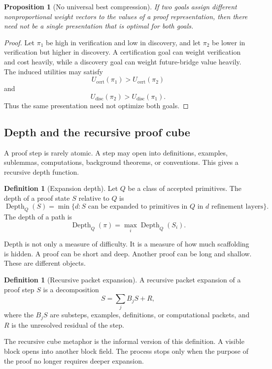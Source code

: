 \documentclass[11pt]{article}
\newtheorem{proposition}[theorem]{Proposition}
\theoremstyle{definition}
\newtheorem{definition}[theorem]{Definition}
\theoremstyle{remark}
\DeclareMathOperator{\Depth}{Depth}
\begin{document}
\begin{proposition}[No universal best compression]
If two goals assign different nonproportional weight vectors to the values of a proof representation, then there need not be a single presentation that is optimal for both goals.
\end{proposition}

\begin{proof}
Let $\pi_1$ be high in verification and low in discovery, and let $\pi_2$ be lower in verification but higher in discovery.  A certification goal can weight verification and cost heavily, while a discovery goal can weight future-bridge value heavily.  The induced utilities may satisfy
\[
        U_{\mathrm{cert}}(\pi_1)>U_{\mathrm{cert}}(\pi_2)
\]
and
\[
        U_{\mathrm{disc}}(\pi_2)>U_{\mathrm{disc}}(\pi_1).
\]
Thus the same presentation need not optimize both goals.
\end{proof}

\subsection{Depth and the recursive proof cube}

A proof step is rarely atomic.  A step may open into definitions, examples, sublemmas, computations, background theorems, or conventions.  This gives a recursive depth function.

\begin{definition}[Expansion depth]
Let $Q$ be a class of accepted primitives.  The depth of a proof state $S$ relative to $Q$ is
\[
        \Depth_Q(S)=
        \min\{d:S\text{ can be expanded to primitives in }Q\text{ in }d\text{ refinement layers}\}.
\]
The depth of a path is
\[
        \Depth_Q(\pi)=\max_i\Depth_Q(S_i).
\]
\end{definition}

Depth is not only a measure of difficulty.  It is a measure of how much scaffolding is hidden.  A proof can be short and deep.  Another proof can be long and shallow.  These are different objects.

\begin{definition}[Recursive packet expansion]
A recursive packet expansion of a proof step $S$ is a decomposition
\[
        S=\sum_j B_jS+R,
\]
where the $B_jS$ are substeps, examples, definitions, or computational packets, and $R$ is the unresolved residual of the step.
\end{definition}

The recursive cube metaphor is the informal version of this definition.  A visible block opens into another block field.  The process stops only when the purpose of the proof no longer requires deeper expansion.
\end{document}
